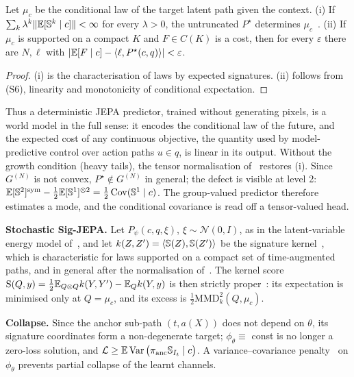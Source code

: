 \documentclass[10pt,twocolumn]{article}
\newcommand{\Sig}{\mathbb{S}}
\newcommand{\G}{G^{(N)}}
\begin{document}
\begin{theorem}\label{thm:law}
Let $\mu_c$ be the conditional law of the target latent path given the context. (i) If $\sum_k\lambda^k\|\E[\Sig^k\mid c]\|<\infty$ for every $\lambda>0$, the untruncated $P^\star$ determines $\mu_c$~\cite{chevyrev2016}. (ii) If $\mu_c$ is supported on a compact $K$ and $F\in C(K)$ is a cost, then for every $\varepsilon$ there are $N,\ell$ with $|\mathbb{E}[F\mid c]-\langle \ell,P^\star(c,q)\rangle|<\varepsilon$.
\end{theorem}
\begin{proof}
(i) is the characterisation of laws by expected signatures. (ii) follows from (S6), linearity and monotonicity of conditional expectation.
\end{proof}
Thus a deterministic JEPA predictor, trained without generating pixels, is a world model in the full sense: it encodes the conditional law of the future, and the expected cost of any continuous objective, the quantity used by model-predictive control over action paths $u\in q$, is linear in its output. Without the growth condition (heavy tails), the tensor normalisation of~\cite{chevyrev2022} restores (i). Since $\G$ is not convex, $P^\star\notin\G$ in general; the defect is visible at level 2: $\E[\Sig^2]^{\mathrm{sym}}-\tfrac12\E[\Sig^1]^{\otimes2}=\tfrac12\operatorname{Cov}(\Sig^1\mid c)$. The group-valued predictor therefore estimates a mode, and the conditional covariance is read off a tensor-valued head.

\textbf{Stochastic Sig-JEPA.} Let $P_\psi(c,q,\xi)$, $\xi\sim\mathcal N(0,I)$, as in the latent-variable energy model of~\cite{lecun2022}, and let $k(Z,Z')=\ip{\Sig(Z)}{\Sig(Z')}$ be the signature kernel~\cite{kiraly2019,salvi2021}, which is characteristic for laws supported on a compact set of time-augmented paths, and in general after the normalisation of~\cite{chevyrev2022}. The kernel score $\mathrm{S}(Q,y)=\tfrac12\mathbb{E}_{Q\otimes Q}k(Y,Y')-\mathbb{E}_Qk(Y,y)$ is then strictly proper~\cite{gneiting2007}: its expectation is minimised only at $Q=\mu_c$, and its excess is $\tfrac12\mathrm{MMD}_k^2(Q,\mu_c)$.

\textbf{Collapse.} Since the anchor sub-path $(t,a(X))$ does not depend on $\theta$, its signature coordinates form a non-degenerate target; $\phi_\theta\equiv$ const is no longer a zero-loss solution, and $\mathcal L\ge\E\operatorname{Var}\big(\pi_{\mathrm{anc}}\Sig_{I_t}\mid c\big)$. A variance--covariance penalty~\cite{bardes2022} on $\phi_\theta$ prevents partial collapse of the learnt channels.
\end{document}
